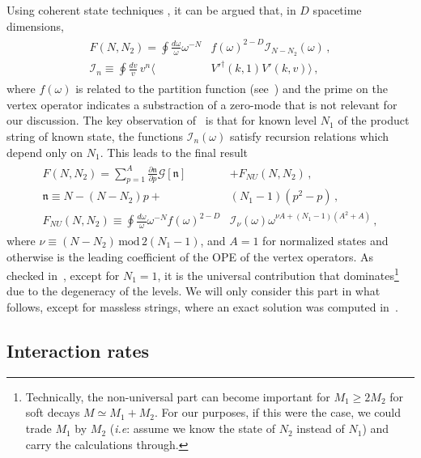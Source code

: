 \documentclass[a4paper,11pt]{article}
\begin{document}
Using coherent state techniques \cite{Green:1987sp}, it can be argued that, in $D$ spacetime dimensions,
\begin{gather}
\begin{split}
    F(N,N_{2})=\oint \frac{d \omega}{\omega}\omega^{-N}& f(\omega)^{2-D} \mathcal{I}_{N-N_2}(\omega) \,, \\ 
    \mathcal{I}_n \equiv \oint \frac{dv}{v} \, v^n\langle &V'^\dag(k,1) V'(k,v) \rangle  \, ,
\end{split}
\end{gather}
where $f(\omega)$ is related to the partition function (see~\cite{Manes:2001cs}) and the prime on the vertex operator indicates a substraction of a zero-mode that is not relevant for our discussion. 
The key observation of~\cite{Manes:2001cs} is that for known level $N_1$ of the product string of known state, the functions $\mathcal{I}_n (\omega)$ satisfy recursion relations which depend only on $N_1$. 
This leads to the final result 
\begin{gather}\label{eq:manes-amplitude}
\begin{split}
    F(N,N_2)=\sum_{p=1}^A \frac{\partial \mathfrak{n}}{\partial p}\mathcal{G}\left[\mathfrak{n}\right] & +F_{NU}(N,N_2) \, , \\
    \mathfrak{n}\equiv N-(N-N_2)p+& (N_1-1)(p^2-p)\, , \\
    F_{NU}(N,N_2)\equiv \oint \frac{d \omega}{\omega}\omega^{-N}f(\omega)^{2-D} & \mathcal{I}_\nu (\omega) \omega^{\nu A +(N_1-1)(A^2+A)} \, ,
\end{split}
\end{gather}
where $\nu \equiv (N-N_2) \, \text{mod} \, 2(N_1-1)$, and $A=1$ for normalized states and otherwise is the leading coefficient of the OPE of the vertex operators.
As checked in~\cite{Manes:2001cs}, except for $N_1=1$, it is the universal contribution that dominates\footnote{Technically, the non-universal part can become important for $M_1\geq 2M_2$ for soft decays $M\simeq M_1+M_2$. For our purposes, if this were the case, we could trade $M_1$ by $M_2$ (\textit{i.e}: assume we know the state of $N_2$ instead of $N_1$) and carry the calculations through.} due to the degeneracy of the levels.
We will only consider this part in what follows, except for massless strings, where an exact solution was computed in~\cite{Amati:1999fv}.

\subsection{Interaction rates}
\end{document}
